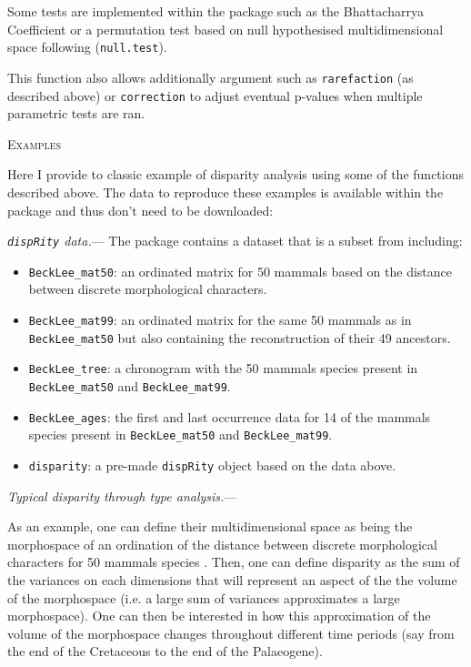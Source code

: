 \documentclass[12pt,letterpaper]{article}
\renewcommand{\section}[1]{%
\bigskip
\begin{center}
\begin{Large}
\normalfont\scshape #1
\medskip
\end{Large}
\end{center}}
\renewcommand{\subsubsection}[1]{%
\vspace{2ex}
\noindent
\textit{#1.}---}
\newcommand{\disp}{\texttt{dispRity} }
\begin{document}
Some tests are implemented within the package such as the Bhattacharrya Coefficient \citep[\texttt{bhatt.coeff}][]{Bhattacharyya,GuillermeCooper} or a permutation test based on null hypothesised multidimensional space following \cite{diaz2016global} (\texttt{null.test}).

This function also allows additionally argument such as \texttt{rarefaction} (as described above) or \texttt{correction} to adjust eventual p-values when multiple parametric tests are ran.

\section{Examples}
Here I provide to classic example of disparity analysis using some of the functions described above.
The data to reproduce these examples is available within the package and thus don't need to be downloaded:

\subsubsection{\disp data}
The package contains a dataset that is a subset from \cite{beckancient2014} including:

\begin{itemize}
    \item \texttt{BeckLee\_mat50}: an ordinated matrix for 50 mammals based on the distance between discrete morphological characters.
    \item \texttt{BeckLee\_mat99}: an ordinated matrix for the same 50 mammals as in \texttt{BeckLee\_mat50} but also containing the reconstruction of their 49 ancestors.
    \item \texttt{BeckLee\_tree}: a chronogram with the 50 mammals species present in \texttt{BeckLee\_mat50} and \texttt{BeckLee\_mat99}.
    \item \texttt{BeckLee\_ages}: the first and last occurrence data for 14 of the mammals species present in \texttt{BeckLee\_mat50} and \texttt{BeckLee\_mat99}.
    \item \texttt{disparity}: a pre-made \disp object based on the data above.
\end{itemize}

\subsubsection{Typical disparity through type analysis}

As an example, one can define their multidimensional space as being the morphospace of an ordination of the distance between discrete morphological characters for 50 mammals species \citep[from][]{beckancient2014}.
Then, one can define disparity as the sum of the variances on each dimensions \citep{Wills1994} that will represent an aspect of the the volume of the morphospace (i.e. a large sum of variances approximates a large morphospace).
One can then be interested in how this approximation of the volume of the morphospace changes throughout different time periods (say from the end of the Cretaceous to the end of the Palaeogene).
\end{document}
